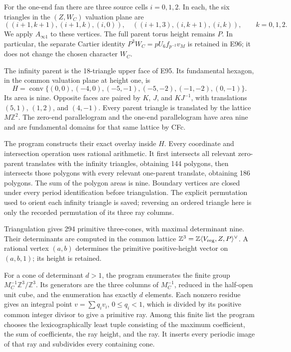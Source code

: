 For the one-end fan there are three source cells \(i=0,1,2\). In each, the six triangles in the \((Z,W_C)\) valuation plane are
\[
 ((i+1,k+1),(i+1,k),(i,0)),\quad
 ((i+1,3),(i,k+1),(i,k)),\qquad k=0,1,2.
\]
We apply \(A_{\infty1}\) to these vertices. The full parent torus height remains \(P\). In particular, the separate Cartier identity \(P^3W_C=pU_6f_{p^{-2}}v_M\) is retained in E96; it does not change the chosen character \(W_C\).

The infinity parent is the 18-triangle upper face of E95. Its fundamental hexagon, in the common valuation plane at height one, is
\[
 H=\operatorname{conv}\{(0,0),(-4,0),(-5,-1),(-5,-2),
                         (-1,-2),(0,-1)\}.                       \tag{CFd}
\]
Its area is nine. Opposite faces are paired by \(K\), \(J\), and \(KJ^{-1}\), with translations \((5,1)\), \((1,2)\), and \((4,-1)\). Every parent triangle is translated by the lattice \(M\mathbb Z^2\). The zero-end parallelogram and the one-end parallelogram have area nine and are fundamental domains for that same lattice by CFc.

The program  constructs their exact overlay inside \(H\). Every coordinate and intersection operation uses rational arithmetic. It first intersects all relevant zero-parent translates with the infinity triangles, obtaining 144 polygons, then intersects those polygons with every relevant one-parent translate, obtaining 186 polygons. The sum of the polygon areas is nine. Boundary vertices are closed under every period identification before triangulation. The explicit permutation used to orient each infinity triangle is saved; reversing an ordered triangle here is only the recorded permutation of its three ray columns.

Triangulation gives 294 primitive three-cones, with maximal determinant nine. Their determinants are computed in the common lattice
\(\mathbb Z^3=\mathbb Z\langle V_{\rm reg},Z,P\rangle^\vee\).
A rational vertex \((a,b)\) determines the primitive positive-height vector on \((a,b,1)\); its height is retained.

For a cone of determinant \(d>1\), the program enumerates the finite group
\(M_C^{-1}\mathbb Z^3/\mathbb Z^3\). Its generators are the three columns of
\(M_C^{-1}\), reduced in the half-open unit cube, and the enumeration has exactly \(d\) elements. Each nonzero residue gives an integral point
\(v=\sum q_i v_i\), \(0\le q_i<1\), which is divided by its positive common integer divisor to give a primitive ray. Among this finite list the program chooses the lexicographically least tuple consisting of the maximum coefficient, the sum of coefficients, the ray height, and the ray. It inserts every periodic image of that ray and subdivides every containing cone.

